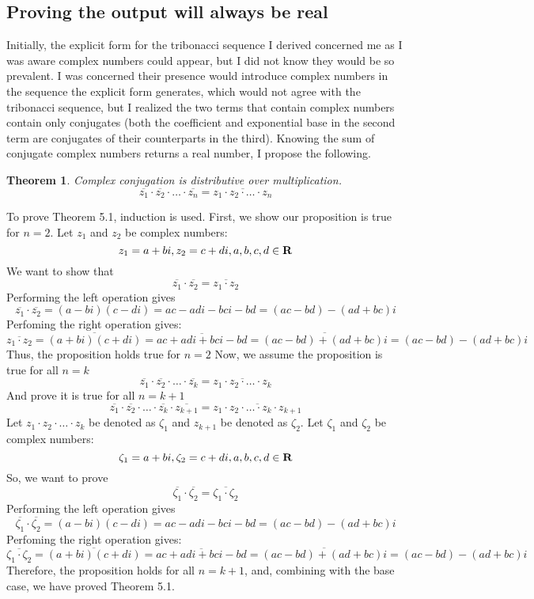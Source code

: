 \documentclass[11pt]{article}
\newtheorem{theorem}{Theorem}[section]
\begin{document}
\subsection{Proving the output will always be real}
Initially, the explicit form for the tribonacci sequence I derived concerned me as I was aware complex numbers could appear, but I did not know they would be so prevalent. I was concerned their presence would introduce complex numbers in the sequence the explicit form generates, which would not agree with the tribonacci sequence, but I realized the two terms that contain complex numbers contain only conjugates (both the coefficient and exponential base in the second term are conjugates of their counterparts in the third). Knowing the sum of conjugate complex numbers returns a real number, I propose the following. 
\begin{theorem}
    Complex conjugation is distributive over multiplication. 
    \[\overline{z_1}\cdot\overline{z_2}\cdot\dots\cdot\overline{z_n}=\overline{z_1\cdot z_2\cdot\dots\cdot z_n}\]
\end{theorem}
To prove Theorem 5.1, induction is used. First, we show our proposition is true for \(n=2\). Let \(z_1\) and \(z_2\) be complex numbers: 
\[z_1=a+bi,z_2=c+di, a,b,c,d\in\mbox{\textbf{R}}\]
We want to show that 
\[\overline{z_1}\cdot\overline{z_2}=\overline{z_1\cdot z_2}\]
Performing the left operation gives 
\[\overline{z_1}\cdot\overline{z_2}=(a-bi)(c-di)=ac-adi-bci-bd=(ac-bd)-(ad+bc)i\]
Perfoming the right operation gives:
\[\overline{z_1 \cdot z_2}=\overline{(a+bi)(c+di)}=\overline{ac+adi+bci-bd}=\overline{(ac-bd)+(ad+bc)i}=(ac-bd)-(ad+bc)i\]
Thus, the proposition holds true for \(n=2\)
Now, we assume the proposition is true for all \(n=k\)
\[\overline{z_1}\cdot\overline{z_2}\cdot\dots\cdot\overline{z_k}=\overline{z_1\cdot z_2\cdot\dots\cdot z_k}\]
And prove it is true for all \(n=k+1\)
\[\overline{z_1}\cdot\overline{z_2}\cdot\dots\cdot\overline{z_k}\cdot\overline{z_{k+1}}=\overline{z_1\cdot z_2\cdot\dots\cdot z_k\cdot z_{k+1}}\]
Let \(z_1\cdot z_2\cdot\dots\cdot z_k\) be denoted as \(\zeta_1\) and \(z_{k+1}\) be denoted as \(\zeta_2\). 
Let \(\zeta_1\) and \(\zeta_2\) be complex numbers:
\[\zeta_1=a+bi,\zeta_2=c+di, a,b,c,d\in\mbox{\textbf{R}}\]
So, we want to prove 
\[\overline{\zeta_1}\cdot\overline{\zeta_2}=\overline{\zeta_1\cdot \zeta_2}\]
Performing the left operation gives 
\[\overline{\zeta_1}\cdot\overline{\zeta_2}=(a-bi)(c-di)=ac-adi-bci-bd=(ac-bd)-(ad+bc)i\]
Perfoming the right operation gives:
\[\overline{\zeta_1 \cdot \zeta_2}=\overline{(a+bi)(c+di)}=\overline{ac+adi+bci-bd}=\overline{(ac-bd)+(ad+bc)i}=(ac-bd)-(ad+bc)i\]
Therefore, the proposition holds for all \(n=k+1\), and, combining with the base case, we have proved Theorem 5.1.
\end{document}
